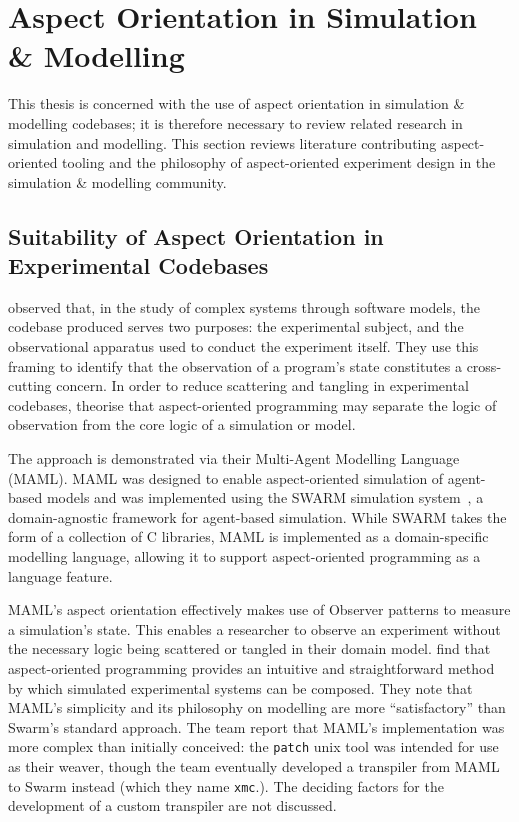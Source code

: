 \section{Aspect Orientation in Simulation \& Modelling}
\label{sec:ao_and_modelling}

This thesis is concerned with the use of aspect orientation in simulation \&
modelling codebases; it is therefore necessary to review related research in
simulation and modelling. This section reviews literature contributing
aspect-oriented tooling and the philosophy of aspect-oriented experiment design
in the simulation \& modelling community.

\subsection{Suitability of Aspect Orientation in Experimental Codebases}
\label{review_gulyas_use_of_aop_in_research_codebases}

\citet{gulyas1999use} observed that, in the study of complex systems through
software models, the codebase produced serves two purposes: the
experimental subject, and the observational apparatus used to conduct the
experiment itself. They use this framing to identify that the observation of a
program's state constitutes a cross-cutting concern. In order to reduce
scattering and tangling in experimental codebases, \citeauthor{gulyas1999use}
theorise that aspect-oriented programming may separate the logic of observation
from the core logic of a simulation or model.

The approach is demonstrated via their Multi-Agent Modelling Language (MAML). MAML
was designed to enable aspect-oriented simulation of agent-based models and was
implemented using the SWARM simulation system~\citep{hiebeler1994swarm}, a
domain-agnostic framework for agent-based simulation. While SWARM takes the form
of a collection of C libraries, MAML is implemented as a domain-specific
modelling language, allowing it to support aspect-oriented programming as a
language feature.

MAML's aspect orientation effectively makes use of Observer patterns to measure
a simulation's state. This enables a researcher to observe an experiment without
the necessary logic being scattered or tangled in their domain model.
\citeauthor{gulyas1999use} find that aspect-oriented programming provides an
intuitive and straightforward method by which simulated experimental systems can
be composed. They note that MAML's simplicity and its philosophy on modelling
are more ``satisfactory'' than Swarm's standard approach. The team report that
MAML's implementation was more complex than initially conceived: the
\lstinline{patch} unix tool was intended for use as their weaver, though the
team eventually developed a transpiler from MAML to Swarm instead (which they
name \lstinline{xmc}.). The deciding factors for the development of a custom
transpiler are not discussed.

